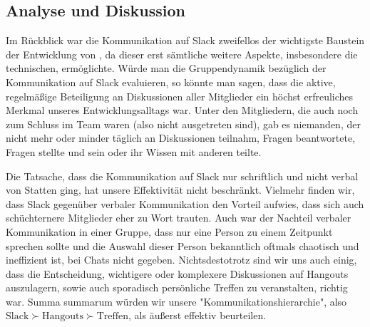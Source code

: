 
\subsection{Analyse und Diskussion}
\label{team:group-anal}

Im Rückblick war die Kommunikation auf Slack zweifellos der wichtigste Baustein
der Entwicklung von \erasim{}, da dieser erst sämtliche weitere Aspekte,
insbesondere die technischen, ermöglichte. Würde man die Gruppendynamik
bezüglich der Kommunikation auf Slack evaluieren, so könnte man sagen, dass die
aktive, regelmäßige Beteiligung an Diskussionen aller Mitglieder ein höchst
erfreuliches Merkmal unseres Entwicklungsalltags war. Unter den Mitgliedern, die
auch noch zum Schluss im \erasim{} Team waren (also nicht ausgetreten sind), gab
es niemanden, der nicht mehr oder minder täglich an Diskussionen teilnahm,
Fragen beantwortete, Fragen stellte und sein oder ihr Wissen mit anderen teilte.

Die Tatsache, dass die Kommunikation auf Slack nur schriftlich und nicht verbal
von Statten ging, hat unsere Effektivität nicht beschränkt. Vielmehr finden wir,
dass Slack gegenüber verbaler Kommunikation den Vorteil aufwies, dass sich auch
schüchternere Mitglieder eher zu Wort trauten. Auch war der Nachteil verbaler
Kommunikation in einer Gruppe, dass nur eine Person zu einem Zeitpunkt sprechen
sollte und die Auswahl dieser Person bekanntlich oftmals chaotisch und
ineffizient ist, bei Chats nicht gegeben. Nichtsdestotrotz sind wir uns auch
einig, dass die Entscheidung, wichtigere oder komplexere Diskussionen auf
Hangouts auszulagern, sowie auch sporadisch persönliche Treffen zu veranstalten,
richtig war. Summa summarum würden wir unsere "Kommunikationshierarchie", also
$\text{Slack} \succ \text{Hangouts} \succ \text{Treffen}$, als äußerst effektiv
beurteilen.
